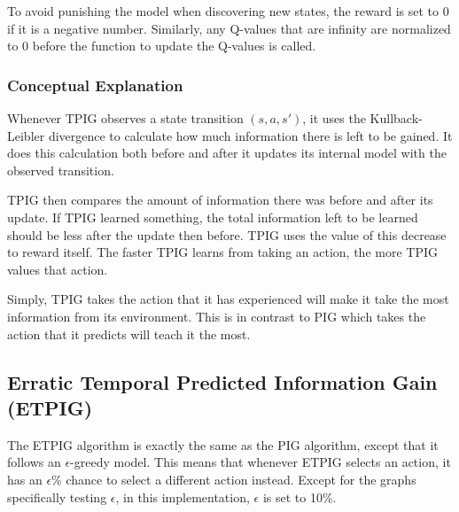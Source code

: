 \documentclass[12pt]{thesis}
\begin{document}
To avoid punishing the model when discovering new states, the reward is set to 0 if it is a negative number. Similarly, any Q-values that are infinity are normalized to 0 before the function to update the Q-values is called.

\subsubsection{Conceptual Explanation}
Whenever TPIG observes a state transition $(s,a,s')$, it uses the Kullback-Leibler divergence to calculate how much information there is left to be gained. It does this calculation both before and after it updates its internal model with the observed transition.

TPIG then compares the amount of information there was before and after its update. If TPIG learned something, the total information left to be learned should be less after the update then before. TPIG uses the value of this decrease to reward itself. The faster TPIG learns from taking an action, the more TPIG values that action.

Simply, TPIG takes the action that it has experienced will make it take the most information from its environment. This is in contrast to PIG which takes the action that it predicts will teach it the most.

\subsection{Erratic Temporal Predicted Information Gain (ETPIG)}
The ETPIG algorithm is exactly the same as the PIG algorithm, except that it follows an $\epsilon$-greedy model. This means that whenever ETPIG selects an action, it has an $\epsilon$\% chance to select a different action instead. Except for the graphs specifically testing $\epsilon$, in this implementation, $\epsilon$ is set to 10\%.
\end{document}
